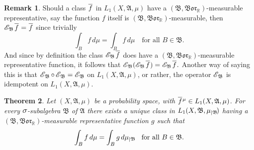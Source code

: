 \documentclass[
twoside=true,
paper=letter,
fontsize=9pt,
pagesize=auto,
leqno,
openany,
headsepline,
overfullrule,
]{scrbook}
\theoremstyle{plain}
\newtheorem{thm}{Theorem}[chapter]
\theoremstyle{plain}
\theoremstyle{definition}
\newtheorem{rmk}[thm]{Remark}
\theoremstyle{bfnoteitalic}
\theoremstyle{bfnoteroman}
\newcommand{\sigalg}[1]{\mathfrak{#1}}
\newcommand{\cali}[1]{\mathscr{#1}}
\newcommand{\condexpsub}[2]
{\mathop{\cali{E}\hspace{-1.5pt}}\nolimits_{#2}\hspace{-1pt}#1}
\newcommand{\condexpop}[1]{\mathop{\cali{E}\hspace{-1pt}}\nolimits_{#1}}
\newcommand{\borel}{\mathfrak{Bor}}
\newcommand{\textsigma}{\hbox{\large{$\sigma$}}\kern-1pt}
\newcommand{\restrictedto}[1]{_{\lvert#1}\kern-1.5pt}
\newcommand{\R}{\mathbb{R}}
\newcommand{\sigmaalgebra}{\sigalg{A}}
\newcommand{\sigmaalgebraii}{\sigalg{B}}
\newcommand{\funcf}{f}
\newcommand{\funcg}{g}
\newcommand{\function}{f}
\newcommand{\functionii}{g}
\newcommand{\measurespace}{X}
\newcommand{\measure}{\mu}
\newcommand{\setii}{B}
\newcommand*\xbar[1]{%
   \hbox{%
     \vbox{%
       \hrule height 0.4pt %
       \kern0.4ex%
       \hbox{%
         \ensuremath{#1}%
       }%
     }%
   }%
}
\newcommand{\lebclass}[1]{\hspace{.5pt}\xbar{#1}\hspace{0.5pt}}
\newcommand{\ellclass}[2]{\lebclass{#1}^{#2}}
\begin{document}
\begin{rmk}
\label{idempotent}
Should a class
$\lebclass{\funcf}$
in $L_1(\measurespace, \sigmaalgebra,\measure)$
have a $(\sigmaalgebraii,\borel_\R)$\hyp{}measurable representative,
say the function $\funcf$ itself is $(\sigmaalgebraii,\borel_\R)$\hyp{}measurable,
then
$\condexpsub{{\lebclass{\funcf}}}{\sigmaalgebraii}
=
\lebclass{\funcf}$
since trivially
\[
\int_\setii \funcf\, d\measure
=
\int_\setii \funcf\, d\measure
\quad\text{for all $\setii \in \sigmaalgebraii$}.
\]
And since by definition the class
$\condexpsub{{\lebclass{\funcf}}}{\sigmaalgebraii}$ does have a
$(\sigmaalgebraii,\borel_\R)$\hyp{}measurable representative function,
it follows that
$\condexpop{\sigmaalgebraii } (\condexpsub{ \lebclass{\funcf} }{ \sigmaalgebraii })
=
\condexpsub{ \lebclass{\funcf} }{ \sigmaalgebraii }.$
Another way of saying this is that
$\condexpop{\sigmaalgebraii}\circ\condexpop{\sigmaalgebraii}
=
\condexpop{\sigmaalgebraii}$
on $L_1 (\measurespace, \sigmaalgebra,\measure)$, or rather, the operator
$\condexpop{\sigmaalgebraii}$ is idempotent
on $L_1 (\measurespace, \sigmaalgebra,\measure)$.
\end{rmk}




\begin{thm}\label{existence_of_conditional}
Let $(\measurespace, \sigmaalgebra,\measure)$ be a probability space, with
$\ellclass{\function}{\measure}\in L_1(\measurespace, \sigmaalgebra,\measure)$. For every $\textsigma$-sub\-algebra $\sigmaalgebraii$ of $\sigmaalgebra$ there exists a unique class in
$L_1(\measurespace, \sigmaalgebraii,\measure\restrictedto{\sigmaalgebraii})$
having a
$(\sigmaalgebraii, \borel_\R)$\hyp{}measurable representative function
$\funcg$
such that
%
\[
\int_B \function\, d\measure = \int_B \functionii\, d\measure\restrictedto{\sigmaalgebraii} 
\quad\text{for all $B \in \sigmaalgebraii$.}
\]
%
\end{thm}
\end{document}
